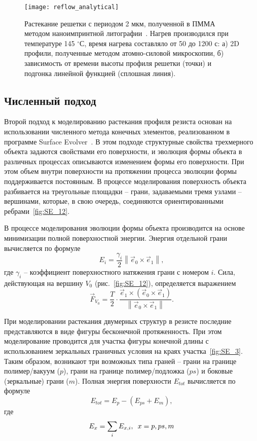 \begin{figure}
	\begin{center}
		\texttt{[image: reflow\_analytical]}
		\caption{Растекание решетки с периодом 2 мкм, полученной в ПММА методом наноимпринтной литографии~\cite{Leveder_2011}. Нагрев производился при температуре 145 $^\circ$С, время нагрева составляло от 50 до 1200 с: а) 2D профили, полученные методом атомно-силовой микроскопии, б) зависимость от времени высоты профиля решетки (точки) и подгонка линейной функцией (сплошная линия).}
		\label{fig:ferlow_analytical}
	\end{center}
\end{figure}


\subsection{Численный подход}
Второй подход к моделированию растекания профиля резиста основан на использовании численного метода конечных элементов, реализованном в программе \textquotedbl Surface Evolver\textquotedbl{}~\cite{Brakke_SE}. В этом подходе структурные свойства трехмерного объекта задаются свойствами его поверхности, и эволюция формы объекта в различных процессах описываются изменением формы его поверхности. При этом объем внутри поверхности на протяжении процесса эволюции формы поддерживается постоянным. В процессе моделирования поверхность объекта разбивается на треугольные площадки -- грани, задаваемыми тремя узлами -- вершинами, которые, в свою очередь, соединяются ориентированными ребрами~\ref{fig:SE_12}.

В процессе моделирования эволюции формы объекта производится на основе минимизации полной поверхностной энергии. Энергия отдельной грани вычисляется по формуле
\begin{equation}
	E_i=\frac{\gamma_i}{2}\left\|\vec{e}_0 \times \vec{e}_1\right\|,
\end{equation}
где $\gamma_i$ -- коэффициент поверхностного натяжения грани с номером $i$. Сила, действующая на вершину $V_0$ (рис.~\ref{fig:SE_12}), определяется выражением
\begin{equation}
	\vec{F}_{V_0}=\frac{T}{2} \cdot \frac{\vec{e}_1 \times\left(\vec{e}_0 \times \vec{e}_1\right)}{\left\|\vec{e}_0 \times \vec{e}_1\right\|}.
\end{equation}

При моделировании растекания двумерных структур в резисте последние представляются в виде фигуры бесконечной протяженность. При этом моделирование проводится для участка фигуры конечной длины с использованием зеркальных граничных условия на краях участка~\ref{fig:SE_3}. Таким образом, возникают три возможных типа граней -- грани на границе полимер/вакуум ($p$), грани на границе полимер/подложка ($ps$) и боковые (зеркальные) грани ($m$). Полная энергия поверхности $E_{tot}$ вычисляется по формуле
\begin{equation}
	E_{tot}=E_p-(E_{p s}+E_m),
\end{equation}
где 
\begin{equation}
	E_x = \sum_{i} E_{x,i}, \hspace{0.5em} x = p, ps, m
\end{equation}


